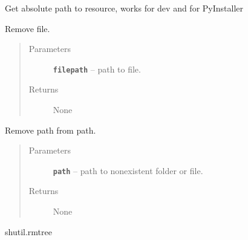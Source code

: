 \documentclass[letterpaper,10pt,english]{sphinxmanual}
\begin{document}

\begin{fulllineitems}
\label{RRtoolbox.lib:RRtoolbox.lib.directory.resource_path}
Get absolute path to resource, works for dev and for PyInstaller

\end{fulllineitems}


\begin{fulllineitems}
\label{RRtoolbox.lib:RRtoolbox.lib.directory.rmFile}
Remove file.
\begin{quote}\begin{description}
\item[{Parameters}] \leavevmode
\textbf{\texttt{filepath}} -- path to file.

\item[{Returns}] \leavevmode
None

\end{description}\end{quote}

\end{fulllineitems}


\begin{fulllineitems}
\label{RRtoolbox.lib:RRtoolbox.lib.directory.rmPath}
Remove path from path.
\begin{quote}\begin{description}
\item[{Parameters}] \leavevmode
\textbf{\texttt{path}} -- path to nonexistent folder or file.

\item[{Returns}] \leavevmode
None

\end{description}\end{quote}




shutil.rmtree



\end{fulllineitems}
\end{document}
